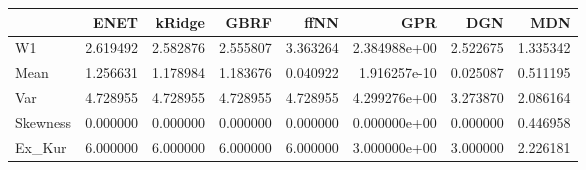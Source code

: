 \begin{tabular}{lrrrrrrr}
\toprule
{} &      ENET &    kRidge &      GBRF &      ffNN &           GPR &       DGN &       MDN \\
\midrule
W1       &  2.619492 &  2.582876 &  2.555807 &  3.363264 &  2.384988e+00 &  2.522675 &  1.335342 \\
Mean     &  1.256631 &  1.178984 &  1.183676 &  0.040922 &  1.916257e-10 &  0.025087 &  0.511195 \\
Var      &  4.728955 &  4.728955 &  4.728955 &  4.728955 &  4.299276e+00 &  3.273870 &  2.086164 \\
Skewness &  0.000000 &  0.000000 &  0.000000 &  0.000000 &  0.000000e+00 &  0.000000 &  0.446958 \\
Ex\_Kur   &  6.000000 &  6.000000 &  6.000000 &  6.000000 &  3.000000e+00 &  3.000000 &  2.226181 \\
\bottomrule
\end{tabular}
